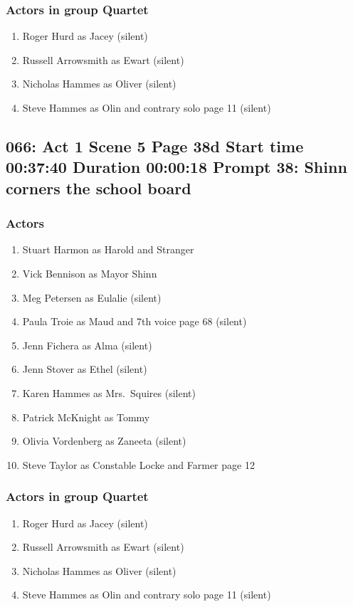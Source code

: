 \subsubsection{Actors in group Quartet}
\begin{enumerate}
\item Roger Hurd as Jacey (silent)
\item Russell Arrowsmith as Ewart (silent)
\item Nicholas Hammes as Oliver (silent)
\item Steve Hammes as Olin and contrary solo page 11 (silent)
\end{enumerate}


\subsection{066: Act 1 Scene 5 Page 38d Start time 00:37:40 Duration 00:00:18 Prompt 38: Shinn corners the school board}

\subsubsection{Actors}
\begin{enumerate}
\item Stuart Harmon as Harold and Stranger
\item Vick Bennison as Mayor Shinn
\item Meg Petersen as Eulalie (silent)
\item Paula Troie as Maud and 7th voice page 68 (silent)
\item Jenn Fichera as Alma (silent)
\item Jenn Stover as Ethel (silent)
\item Karen Hammes as Mrs.~Squires (silent)
\item Patrick McKnight as Tommy
\item Olivia Vordenberg as Zaneeta (silent)
\item Steve Taylor as Constable Locke and Farmer page 12
\end{enumerate}
\subsubsection{Actors in group Quartet}
\begin{enumerate}
\item Roger Hurd as Jacey (silent)
\item Russell Arrowsmith as Ewart (silent)
\item Nicholas Hammes as Oliver (silent)
\item Steve Hammes as Olin and contrary solo page 11 (silent)
\end{enumerate}


